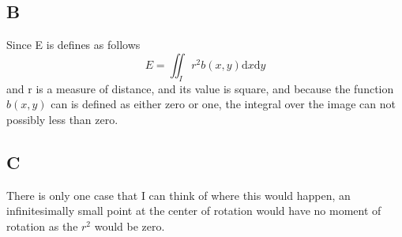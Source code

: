 \documentclass{article}
\begin{document}
\subsection{B}
Since E is defines as follows
\[
E=\iint_{I}r^2 b(x,y)\mathrm{d}x \mathrm{d}y
\] 
and r is a measure of distance, and its value is square, and because the function $b(x,y)$ can is defined as either zero or one, the integral over the image can not possibly less than zero.

\subsection{C}
There is only one case that I can think of where this would happen, an infinitesimally small point at the center of rotation would have no moment of rotation as the $r^2$ would be zero. 
\end{document}
